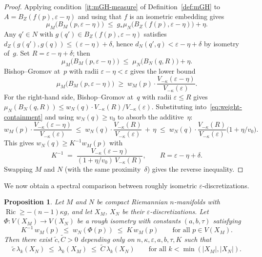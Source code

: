 \documentclass[10pt,reqno]{amsart}
\newtheorem{proposition}[theorem]{Proposition}
\theoremstyle{remark}
\newcommand{\Ric}{\operatorname{Ric}}
\newcommand{\Vk}{V_{-\kappa}}
\begin{document}
\begin{proof}
Applying condition~\ref{it:mGH-measure} of Definition~\ref{def:mGH} to
$A=B_Z(f(p),\varepsilon-\eta)$ and using that $f$ is an isometric
embedding gives
\[
  \mu_M\bigl(B_M(p,\varepsilon-\eta)\bigr)
  \;\leq\;
  g_*\mu_N\bigl(B_Z(f(p),\varepsilon-\eta)\bigr)+\eta.
\]
Any $q'\in N$ with $g(q')\in B_Z(f(p),\varepsilon-\eta)$ satisfies
$d_Z(g(q'),g(q))\leq(\varepsilon-\eta)+\delta$, hence
$d_N(q',q)<\varepsilon-\eta+\delta$ by isometry of~$g$. Set
$R=\varepsilon-\eta+\delta$; then
\begin{equation}
\label{eq:weight-containment}
  \mu_M\bigl(B_M(p,\varepsilon-\eta)\bigr)
  \;\leq\;
  \mu_N\bigl(B_N(q,R)\bigr)+\eta.
\end{equation}
Bishop--Gromov at~$p$ with radii $\varepsilon-\eta<\varepsilon$
gives the lower bound
\[
  \mu_M\bigl(B_M(p,\varepsilon-\eta)\bigr)
  \;\geq\;
  w_M(p)\cdot\frac{\Vk(\varepsilon-\eta)}{\Vk(\varepsilon)}.
\]
For the right-hand side, Bishop--Gromov at~$q$ with radii
$\varepsilon\leq R$ gives
$\mu_N(B_N(q,R))\leq w_N(q)\cdot\Vk(R)/\Vk(\varepsilon)$.
Substituting into~\eqref{eq:weight-containment} and using
$w_N(q)\geq v_0$ to absorb the additive~$\eta$:
\[
  w_M(p)\cdot\frac{\Vk(\varepsilon-\eta)}{\Vk(\varepsilon)}
  \;\leq\;
  w_N(q)\cdot\frac{\Vk(R)}{\Vk(\varepsilon)}\,+\,\eta
  \;\leq\;
  w_N(q)\cdot\frac{\Vk(R)}{\Vk(\varepsilon)}
  \bigl(1+\eta/v_0\bigr).
\]
This gives $w_N(q)\geq K^{-1}w_M(p)$ with
\[
  K^{-1}\;=\;
  \frac{\Vk(\varepsilon-\eta)}{(1+\eta/v_0)\,\Vk(R)},
  \qquad R=\varepsilon-\eta+\delta.
\]
Swapping $M$ and $N$ (with the same proximity~$\delta$) gives the
reverse inequality.
\end{proof}

We now obtain a spectral comparison between roughly isometric
$\varepsilon$-discretizations.
\begin{proposition}
\label{prop:weighted-rough}
Let $M$ and $N$ be compact Riemannian $n$-manifolds with
$\Ric\geq-(n-1)\kappa g$, and let $X_M$, $X_N$ be their
$\varepsilon$-discretizations. Let $\Phi:V(X_M)\to V(X_N)$ be a
rough isometry with constants $(a,b,\tau)$ satisfying
\begin{equation}
\label{eq:weight-comp}
  K^{-1}\,w_M(p)\;\leq\; w_N(\Phi(p))\;\leq\; K\,w_M(p)
  \qquad\text{for all }p\in V(X_M).
\end{equation}
Then there exist $\tilde c,\tilde C>0$ depending only on
$n,\kappa,\varepsilon,a,b,\tau,K$ such that
\[
  \tilde c\,\lambda_k(X_N)\;\leq\;\lambda_k(X_M)\;\leq\;
  \tilde C\,\lambda_k(X_N)
  \qquad\text{for all }k<\min(|X_M|,|X_N|).
\]
\end{proposition}
\end{document}
